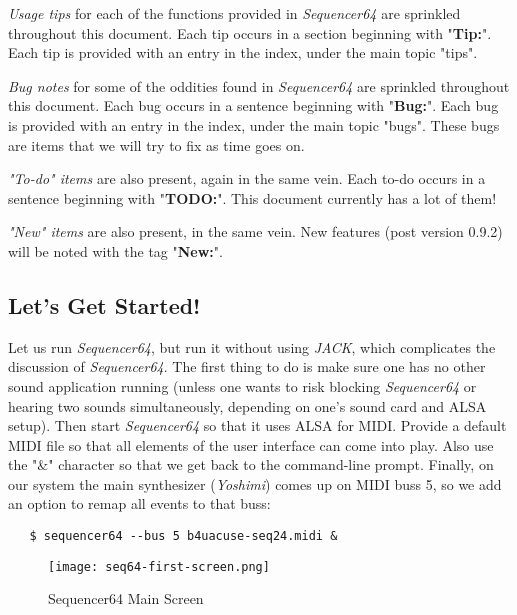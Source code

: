 \documentclass[
 11pt,
 twoside,
 a4paper,
 headinclude,
 footinclude,
 final                                 %
]{article}
\begin{document}
   \textsl{Usage tips}
   for each of the functions provided in
   \textsl{Sequencer64} are sprinkled throughout this document.
   Each tip occurs in a section beginning with "\textbf{Tip:}".
   Each tip is provided with an entry in the index, under the
   main topic "tips".

   \textsl{Bug notes}
   for some of the oddities found in \textsl{Sequencer64} are
   sprinkled throughout this document.
   Each bug occurs in a sentence beginning with "\textbf{Bug:}".
   Each bug is provided with an entry in the index, under the
   main topic "bugs".  These bugs are items that we will try to
   fix as time goes on.

   \textsl{"To-do" items}
   are also present, again in the same vein.
   Each to-do occurs in a sentence beginning with "\textbf{TODO:}".
   This document currently has a lot of them!

   \textsl{"New" items}
   are also present, in the same vein.
   New features (post version 0.9.2) will be noted with the tag
   "\textbf{New:}".

\subsection{Let's Get Started!}
\label{subsec:introduction_lets_get_started}

   Let us run \textsl{Sequencer64}, but run it without using \textsl{JACK},
   which complicates the discussion of \textsl{Sequencer64}.  The first
   thing to do is make sure one has no other sound application running
   (unless one wants to risk blocking \textsl{Sequencer64} or hearing two
    sounds simultaneously, depending on one's sound card and ALSA setup).
   Then start \textsl{Sequencer64} so that it uses ALSA for MIDI.  Provide a
   default MIDI file so that all elements of the user interface can come
   into play.  Also use the "\&" character so that we get back to the
   command-line prompt.  Finally, on our system the main synthesizer
   (\textsl{Yoshimi}) comes up on MIDI buss 5, so we add an option to remap
   all events to that buss:

\begin{verbatim}
   $ sequencer64 --bus 5 b4uacuse-seq24.midi &
\end{verbatim}

\begin{figure}[H]
   \centering 
   \texttt{[image: seq64-first-screen.png]}
   \caption{Sequencer64 Main Screen}
   \label{fig:seq64_main_screen}
\end{figure}
\end{document}
